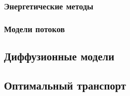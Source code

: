 \subsubsection{Энергетические методы}




\subsubsection{Модели потоков}


\subsection{Диффузионные модели}



\subsection{Оптимальный транспорт}






